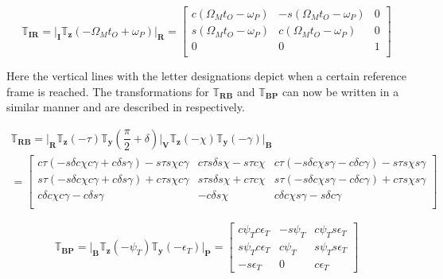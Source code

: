 \begin{equation} \label{eq:IRtrans}
\mathbb{T}_{\mathbf{IR}}=\Bigg|_{\mathbf{I}}\mathbb{T}_{\mathbf{z}}\left(-\Omega_{M}t_{O}+\omega_{P}\right)\Bigg|_{\mathbf{R}}=
\begin{bmatrix}
c\left(\Omega_{M}t_{O}-\omega_{P}\right) & -s\left(\Omega_{M}t_{O}-\omega_{P}\right) & 0\\
s\left(\Omega_{M}t_{O}-\omega_{P}\right) & c\left(\Omega_{M}t_{O}-\omega_{P}\right) & 0\\
0& 0& 1\\
\end{bmatrix}
\end{equation}

Here the vertical lines with the letter designations depict when a certain reference frame is reached. The transformations for $\mathbb{T}_{\mathbf{RB}}$ and $\mathbb{T}_{\mathbf{BP}}$ can now be written in a similar manner and are described in  respectively.

\begin{multline} \label{eq:RBtrans}
\mathbb{T}_{\mathbf{RB}}=\Bigg|_{\mathbf{R}}\mathbb{T}_{\mathbf{z}}\left(-\tau\right)\mathbb{T}_{\mathbf{y}}\left(\dfrac{\pi}{2}+\delta\right)\Bigg|_{\mathbf{V}}\mathbb{T}_{\mathbf{z}}\left(-\chi\right)\mathbb{T}_{\mathbf{y}}\left(-\gamma\right)\Bigg|_{\mathbf{B}}\\
=
\begin{bmatrix}
c\tau\left(-s\delta c\chi c\gamma +c\delta s\gamma \right)-s\tau s\chi c\gamma  & c\tau s\delta s\chi -s\tau c\chi & c\tau\left(-s\delta c\chi s\gamma -c\delta c\gamma \right)-s\tau s\chi s\gamma \\
s\tau\left(-s\delta c\chi c\gamma +c\delta s\gamma \right)+c\tau s\chi c\gamma  & s\tau s\delta s\chi +c\tau c\chi & s\tau\left(-s\delta c\chi s\gamma -c\delta c\gamma \right)+c\tau s\chi s\gamma \\
c\delta c\chi c\gamma -c\delta s\gamma  & -c\delta s\chi &  c\delta c\chi s\gamma -s\delta c\gamma \\
\end{bmatrix}
\end{multline}



\begin{equation} \label{eq:BPtrans}
\mathbb{T}_{\mathbf{BP}}=\Bigg|_{\mathbf{B}}\mathbb{T}_{\mathbf{z}}\left(-\psi_{T}\right)\mathbb{T}_{\mathbf{y}}\left(-\epsilon_{T}\right)\Bigg|_{\mathbf{P}}=
\begin{bmatrix}
c\psi_{T}c\epsilon_{T} & -s\psi_{T} & c\psi_{T}s\epsilon_{T}\\
s\psi_{T}c\epsilon_{T} & c\psi_{T} & s\psi_{T}s\epsilon_{T}\\
-s\epsilon_{T} & 0 & c\epsilon_{T}
\end{bmatrix}
\end{equation}



